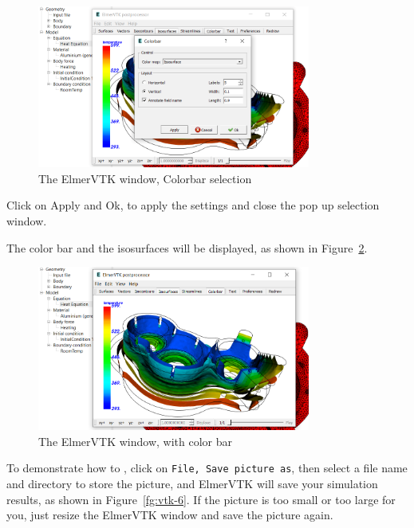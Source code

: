 \begin{figure}[H]
\begin{center}
\includegraphics[width=0.8\textwidth]{vtk-4}
\caption{The ElmerVTK window, Colorbar selection}\label{fg:vtk-4}
\end{center}
\end{figure}

Click on Apply and Ok, to apply the settings and close the pop up selection window.

\newpage

The color bar and the isosurfaces will be displayed, as shown in Figure~\ref{fg:vtk-5}.

\begin{figure}[H]
\begin{center}
\includegraphics[width=0.8\textwidth]{vtk-5}
\caption{The ElmerVTK window, with color bar}\label{fg:vtk-5}
\end{center}
\end{figure}

To demonstrate how to , click on \texttt{File, Save picture as}, then select a file name and directory to store the picture, and ElmerVTK will save your simulation results, as shown in Figure~\ref{fg:vtk-6}.  If the picture is too small or too large for you, just resize the ElmerVTK window and save the picture again.

